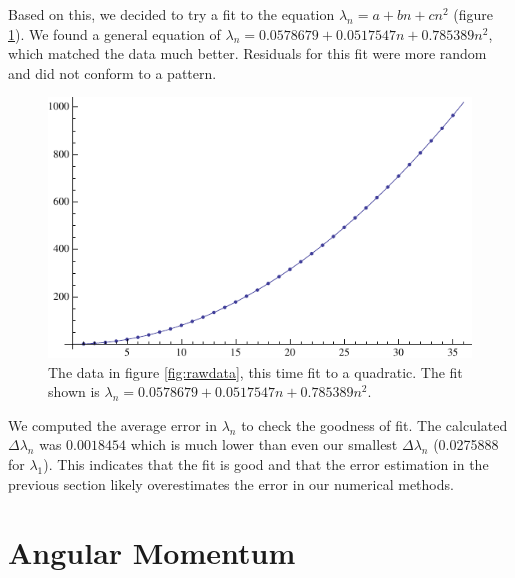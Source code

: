 \documentclass[12pt,twoside]{reedthesis}
\begin{document}
Based on this, we decided to try a fit to the equation $\lambda_n = a + b n + c n^2$ (figure \ref{fig:quadfit}). We found a general equation of $\lambda_n = 0.0578679 + 0.0517547 n + 0.785389 n^2$, which matched the data much better. Residuals for this fit were more random and did not conform to a pattern.
\begin{figure}[h]
\centering
\includegraphics{Figures/quadfit}
\caption[Quadratic fit]{The data in figure \ref{fig:rawdata}, this time fit to a quadratic. The fit shown is $\lambda_n = 0.0578679 + 0.0517547 n + 0.785389 n^2$.}
\label{fig:quadfit}
\end{figure}

We computed the average error in $\lambda_n$ to check the goodness of fit. The calculated $\Delta \lambda_n$ was $0.0018454$ which is much lower than even our smallest $\Delta \lambda_n$ (0.0275888 for $\lambda_1$). This indicates that the fit is good and that the error estimation in the previous section likely overestimates the error in our numerical methods.

\section{Angular Momentum}
\end{document}
